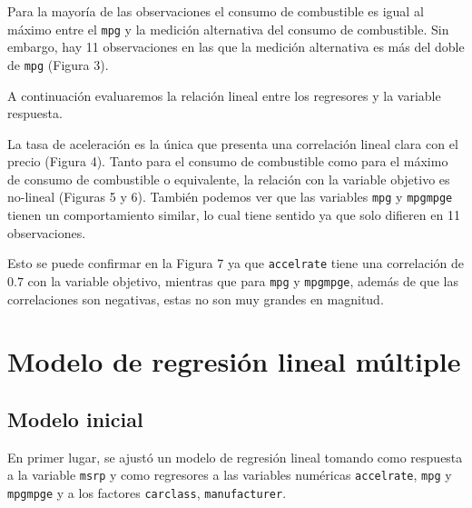 \documentclass[11pt]{article}
\begin{document}
    
    Para la mayoría de las observaciones el consumo de combustible es igual
al máximo entre el \texttt{mpg} y la medición alternativa del consumo de
combustible. Sin embargo, hay 11 observaciones en las que la medición
alternativa es más del doble de \texttt{mpg} (Figura 3).

    A continuación evaluaremos la relación lineal entre los regresores y la
variable respuesta.

    \begin{center}
    \end{center}
    
    
    \begin{center}
    \end{center}
    
    
    La tasa de aceleración es la única que presenta una correlación lineal
clara con el precio (Figura 4). Tanto para el consumo de combustible
como para el máximo de consumo de combustible o equivalente, la relación
con la variable objetivo es no-lineal (Figuras 5 y 6). También podemos
ver que las variables \texttt{mpg} y \texttt{mpgmpge} tienen un
comportamiento similar, lo cual tiene sentido ya que solo difieren en 11
observaciones.

Esto se puede confirmar en la Figura 7 ya que \texttt{accelrate} tiene
una correlación de \(0.7\) con la variable objetivo, mientras que para
\texttt{mpg} y \texttt{mpgmpge}, además de que las correlaciones son
negativas, estas no son muy grandes en magnitud.

    \hypertarget{modelo-de-regresiuxf3n-lineal-muxfaltiple}{%
\section{Modelo de regresión lineal
múltiple}\label{modelo-de-regresiuxf3n-lineal-muxfaltiple}}

    \hypertarget{modelo-inicial}{%
\subsection{Modelo inicial}\label{modelo-inicial}}

    En primer lugar, se ajustó un modelo de regresión lineal tomando como
respuesta a la variable \texttt{msrp} y como regresores a las variables
numéricas \texttt{accelrate}, \texttt{mpg} y \texttt{mpgmpge} y a los
factores \texttt{carclass}, \texttt{manufacturer}.
\end{document}
